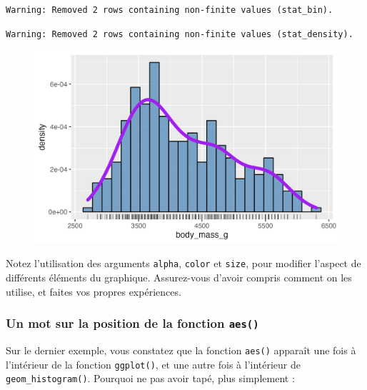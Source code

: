 \documentclass[
  letterpaper,
  DIV=11,
  numbers=noendperiod]{scrreprt}
\begin{document}
\begin{verbatim}
Warning: Removed 2 rows containing non-finite values (stat_bin).
\end{verbatim}

\begin{verbatim}
Warning: Removed 2 rows containing non-finite values (stat_density).
\end{verbatim}

\begin{figure}[H]

{\centering \includegraphics{./03-visualization_files/figure-pdf/unnamed-chunk-23-1.png}

}

\end{figure}

Notez l'utilisation des arguments \texttt{alpha}, \texttt{color} et
\texttt{size}, pour modifier l'aspect de différents éléments du
graphique. Assurez-vous d'avoir compris comment on les utilise, et
faites vos propres expériences.

\hypertarget{un-mot-sur-la-position-de-la-fonction-aes}{%
\subsubsection{\texorpdfstring{Un mot sur la position de la fonction
\texttt{aes()}}{Un mot sur la position de la fonction aes()}}\label{un-mot-sur-la-position-de-la-fonction-aes}}

Sur le dernier exemple, vous constatez que la fonction \texttt{aes()}
apparaît une fois à l'intérieur de la fonction \texttt{ggplot()}, et une
autre fois à l'intérieur de \texttt{geom\_histogram()}. Pourquoi ne pas
avoir tapé, plus simplement :
\end{document}
